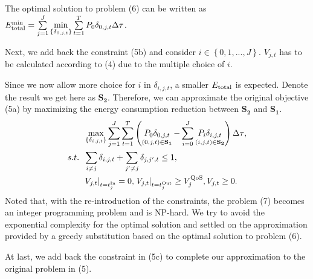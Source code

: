 \documentclass[journal]{IEEEtran}
\begin{document}
   The optimal solution to problem (6) can be written as $E_{\rm{total}}^{\min}=\sum\limits_{j = 1}^J \mathop {\min }\limits_{{\left\{ {{\delta _{0,j,t}}} \right\}}} {\sum\limits_{t = 1}^T {{P_{0}}\delta _{0,j,t} \Delta \tau } } $. 
  
   
  
   Next, we add back the constraint (5b) and consider $i \in \left\{ {0,1,...,J} \right\}$. $V_{j,t}$ has to be calculated according to (4) due to the multiple choice of $i$. 
  
   Since we now allow more choice for $i$ in $\delta _{i,j,t}$, a smaller $E_{\rm{total}}$ is expected. Denote the result we get here as ${{\mathbf{S}}_{\mathbf{2}}}$. Therefore, we can approximate the original objective (5a) by maximizing the energy consumption reduction between ${{\mathbf{S}}_{\mathbf{2}}}$ and ${{\mathbf{S}}_{\mathbf{1}}}$. 
   \begin{subequations}
   \begin{align}
    &\mathop {\max }\limits_{{\left\{ {{\delta _{i,j,t}}} \right\}}}  {{\sum\limits_{j = 1}^J \sum\limits_{t = 1}^{T}{\left( {\mathop {{P_{0}}\delta _{0,j,t} }\limits_{\left( {0,j,t} \right) \in {{\mathbf{S}}_{\mathbf{1}}}} - \sum\limits_{i = 0}^J {\mathop {{P_{i}}\delta _{i,j,t}}\limits_{\left( {i,j,t} \right) \in {{\mathbf{S}}_{\mathbf{2}}}} } } \right) \Delta \tau } } } ,\\
    {s.t.} \;\; &\sum\limits_{i \ne j} {{{\delta _{i,j,t}}} } + \sum\limits_{j' \ne j} { {{\delta _{j,j',t}}} \le {1}} ,\\
    \;\;\;\;\;\; &{{{\left. {{V_{j,t}}} \right|}_{t = t_j^{{\rm{In}}}}} = 0, \left. {{V_{j,t}}} \right|_{t = t_j^{{\rm{Out}}}}} \ge V_j^{\rm{QoS}}, {V_{j,t}} \ge 0.
  \end{align}
  \end{subequations}
   Noted that, with the re-introduction of the constraints, the problem (7) becomes an integer programming problem and is NP-hard. We try to avoid the exponential complexity for the optimal solution and settled on the approximation provided by a greedy substitution based on the optimal solution to problem (6).  
  

  At last, we add back the constraint in (5c) to complete our approximation to the original problem in (5). 
  
\end{document}
